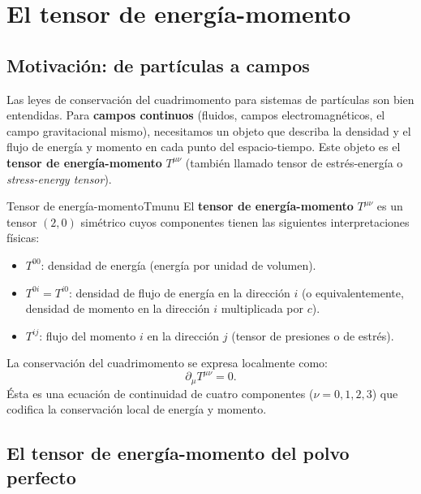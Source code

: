 \section{El tensor de energía-momento}
\label{sec:Tmunu}

\subsection{Motivación: de partículas a campos}

Las leyes de conservación del cuadrimomento para sistemas de partículas son bien entendidas. Para \textbf{campos continuos} (fluidos, campos electromagnéticos, el campo gravitacional mismo), necesitamos un objeto que describa la densidad y el flujo de energía y momento en cada punto del espacio-tiempo. Este objeto es el \textbf{tensor de energía-momento} $T^{\mu\nu}$ (también llamado tensor de estrés-energía o \emph{stress-energy tensor}).

\begin{definicion}{Tensor de energía-momento}{Tmunu}
El \textbf{tensor de energía-momento} $T^{\mu\nu}$ es un tensor $(2,0)$ simétrico cuyos componentes tienen las siguientes interpretaciones físicas:
\begin{itemize}[leftmargin=2em]
  \item $T^{00}$: densidad de energía (energía por unidad de volumen).
  \item $T^{0i} = T^{i0}$: densidad de flujo de energía en la dirección $i$ (o equivalentemente, densidad de momento en la dirección $i$ multiplicada por $c$).
  \item $T^{ij}$: flujo del momento $i$ en la dirección $j$ (tensor de presiones o de estrés).
\end{itemize}
\end{definicion}

La conservación del cuadrimomento se expresa localmente como:
\begin{equation}
  \partial_\mu T^{\mu\nu} = 0.
  \label{eq:conserv_Tmunu}
\end{equation}
Ésta es una ecuación de continuidad de cuatro componentes ($\nu = 0, 1, 2, 3$) que codifica la conservación local de energía y momento.

\subsection{El tensor de energía-momento del polvo perfecto}

